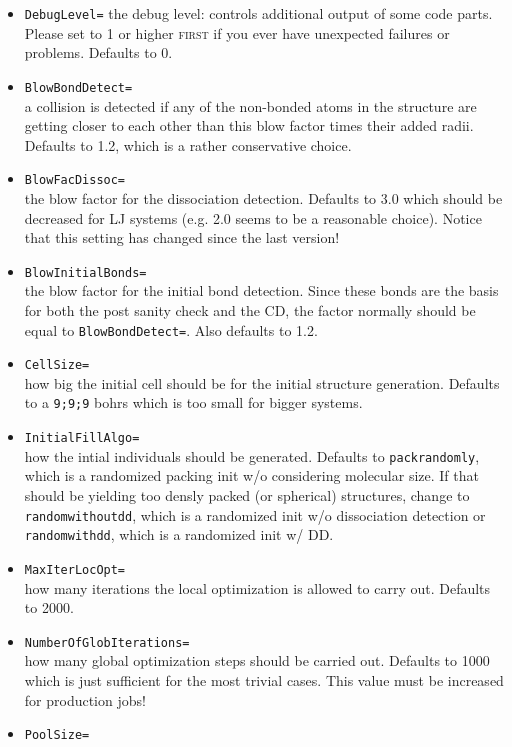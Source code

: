 \documentclass[a4paper,10pt]{scrbook}
\begin{document}
\begin{itemize}
  \item \texttt{DebugLevel=}
	the debug level: controls additional output of some code parts. Please
set to 1 or higher \textsc{first} if you ever have unexpected failures or problems.
Defaults to 0.
  \item \texttt{BlowBondDetect=}\\
	a collision is detected if any of the non-bonded atoms in the structure
are getting closer to each other than this blow factor times their added radii.
Defaults to 1.2, which is a rather conservative choice.
  \item \texttt{BlowFacDissoc=}\\
	the blow factor for the dissociation detection. Defaults to 3.0 which
should be decreased for LJ systems (e.g. 2.0 seems to be a reasonable
choice). Notice that this setting has changed since the last version!
  \item \texttt{BlowInitialBonds=}\\
	the blow factor for the initial bond detection. Since these bonds are
the basis for both the post sanity check and the CD, the factor normally should
be equal to \texttt{BlowBondDetect=}. Also defaults to 1.2.
  \item \texttt{CellSize=}\\
	how big the initial cell should be for the initial structure
generation. Defaults to a \texttt{9;9;9} bohrs which is too small for bigger
systems.
  \item \texttt{InitialFillAlgo=}\\
	how the intial individuals should be generated. Defaults to 
\texttt{packrandomly}, which is
a randomized packing init w/o considering molecular size. If that should be
yielding too densly packed (or spherical) structures,
change to \texttt{randomwithoutdd}, which is a randomized init w/o dissociation 
detection or \texttt{randomwithdd}, which
is a randomized init w/ DD.
  \item \texttt{MaxIterLocOpt=}\\
	how many iterations the local optimization is allowed to carry out.
Defaults to 2000.
  \item \texttt{NumberOfGlobIterations=}\\
	how many global optimization steps should be carried out. Defaults to
1000 which is just sufficient for the most trivial cases. This value must be
increased for production jobs!
  \item \texttt{PoolSize=}\\

\end{itemize}
\end{document}
